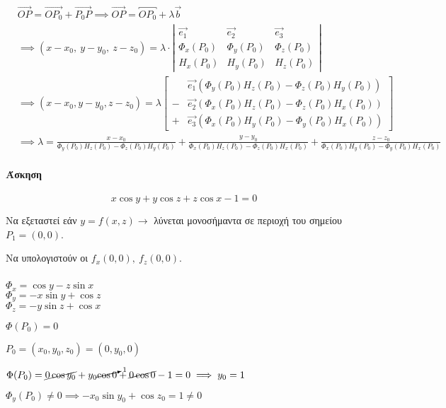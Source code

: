 \documentclass[11pt,a4paper,titlepage,draft]{article}
\begin{document}
\subparagraph{}
\begin{align*}
&\overrightarrow{OP} = \overrightarrow{OP_0} + \overrightarrow{P_0P} \implies \overrightarrow{OP} = \overbracket{OP_0} + \lambda \vec b \\
&\implies (x-x_0,\ y-y_0,\ z-z_0) = \lambda \cdot \left|
\begin{matrix}
\overrightarrow{e_1} & \overrightarrow{e_2} & \overrightarrow{e_3} \\
\Phi_x(P_0) & \Phi_y(P_0) & \Phi_z(P_0) \\
H_x(P_0) & H_y(P_0)&H_z(P_0)
\end{matrix}
\right|
\\
&\implies
(x-x_0,y-y_0,z-z_0) = \lambda \left[
\begin{array}{rl}
&\overrightarrow{e_1} \left(\Phi_y(P_0)H_z(P_0)-\Phi_z(P_0)H_y(P_0) \right) \\
- & \overrightarrow{e_2} \left(\Phi_x(P_0)H_z(P_0)- \Phi_z(P_0)H_x(P_0) \right) \\
+ & \overrightarrow{e_3} \left( \Phi_x(P_0)H_y(P_0)-\Phi_y(P_0)H_x(P_0) \right)
\end{array}
\right]
\\ &\implies
\lambda = \frac{x-x_0}{\Phi_y(P_0)H_z(P_0)-\Phi_z(P_0)H_y(P_0)} + \frac{y-y_0}{\Phi_x(P_0)H_z(P_0)- \Phi_z(P_0)H_x(P_0)} + \frac{z-z_0}{ \Phi_x(P_0)H_y(P_0)-\Phi_y(P_0)H_x(P_0)}
\end{align*}

\paragraph{Άσκηση}
\[
x\cos y+y\cos z +z\cos x - 1=0
\]

Να εξεταστεί εάν \( y=f(x,z) \to \) λύνεται μονοσήμαντα σε περιοχή του σημείου \( P_1=(0,0) \).

Να υπολογιστούν οι \( f_x(0,0),\ f_z(0,0) \).

\subparagraph{}
\begin{enumparen}
\item \( \Phi_x = \cos y -z\sin x\)\\
\(\Phi_y = -x\sin y + \cos z \)\\
\( \Phi_z = -y\sin z + \cos x \)
\item \(\Phi(P_0)=0 \)

\(P_0 = (x_0,y_0,z_0) = (0,y_0,0) \)

\(\Phi(P_0) = \cancel{0\cos y_0} + y_0 \cancelto{1}{\cos 0} + \cancel{0\cos0} -1 =0 \implies y_0 = 1 \)
\item \( \Phi_y(P_0) \neq0 \implies -x_0\sin y_0 + \cos z_0 = 1 \neq 0 \)
\end{enumparen}
\end{document}
